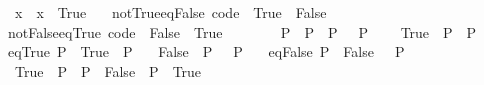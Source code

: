 \begin{isabellebody}
\ \ \ \ {\isachardoublequoteopen}{\isacharparenleft}{\kern0pt}x\ {\isacharequal}{\kern0pt}\ x{\isacharparenright}{\kern0pt}\ {\isacharequal}{\kern0pt}\ True{\isachardoublequoteclose}\isanewline
\ \ \ not{\isacharunderscore}{\kern0pt}True{\isacharunderscore}{\kern0pt}eq{\isacharunderscore}{\kern0pt}False\ {\isacharbrackleft}{\kern0pt}code{\isacharbrackright}{\kern0pt}{\isacharcolon}{\kern0pt}\ {\isachardoublequoteopen}{\isacharparenleft}{\kern0pt}{\isasymnot}\ True{\isacharparenright}{\kern0pt}\ {\isacharequal}{\kern0pt}\ False{\isachardoublequoteclose}\isanewline
\ \ \ not{\isacharunderscore}{\kern0pt}False{\isacharunderscore}{\kern0pt}eq{\isacharunderscore}{\kern0pt}True\ {\isacharbrackleft}{\kern0pt}code{\isacharbrackright}{\kern0pt}{\isacharcolon}{\kern0pt}\ {\isachardoublequoteopen}{\isacharparenleft}{\kern0pt}{\isasymnot}\ False{\isacharparenright}{\kern0pt}\ {\isacharequal}{\kern0pt}\ True{\isachardoublequoteclose}\isanewline
\ \ \isanewline
\ \ \ \ {\isachardoublequoteopen}{\isacharparenleft}{\kern0pt}{\isasymnot}\ P{\isacharparenright}{\kern0pt}\ {\isasymnoteq}\ P{\isachardoublequoteclose}\ \ {\isachardoublequoteopen}P\ {\isasymnoteq}\ {\isacharparenleft}{\kern0pt}{\isasymnot}\ P{\isacharparenright}{\kern0pt}{\isachardoublequoteclose}\isanewline
\ \ \ \ {\isachardoublequoteopen}{\isacharparenleft}{\kern0pt}True\ {\isacharequal}{\kern0pt}\ P{\isacharparenright}{\kern0pt}\ {\isacharequal}{\kern0pt}\ P{\isachardoublequoteclose}\isanewline
\ \ \ eq{\isacharunderscore}{\kern0pt}True{\isacharcolon}{\kern0pt}\ {\isachardoublequoteopen}{\isacharparenleft}{\kern0pt}P\ {\isacharequal}{\kern0pt}\ True{\isacharparenright}{\kern0pt}\ {\isacharequal}{\kern0pt}\ P{\isachardoublequoteclose}\isanewline
\ \ \ {\isachardoublequoteopen}{\isacharparenleft}{\kern0pt}False\ {\isacharequal}{\kern0pt}\ P{\isacharparenright}{\kern0pt}\ {\isacharequal}{\kern0pt}\ {\isacharparenleft}{\kern0pt}{\isasymnot}\ P{\isacharparenright}{\kern0pt}{\isachardoublequoteclose}\isanewline
\ \ \ eq{\isacharunderscore}{\kern0pt}False{\isacharcolon}{\kern0pt}\ {\isachardoublequoteopen}{\isacharparenleft}{\kern0pt}P\ {\isacharequal}{\kern0pt}\ False{\isacharparenright}{\kern0pt}\ {\isacharequal}{\kern0pt}\ {\isacharparenleft}{\kern0pt}{\isasymnot}\ P{\isacharparenright}{\kern0pt}{\isachardoublequoteclose}\isanewline
\ \ \isanewline
\ \ \ \ {\isachardoublequoteopen}{\isacharparenleft}{\kern0pt}True\ {\isasymlongrightarrow}\ P{\isacharparenright}{\kern0pt}\ {\isacharequal}{\kern0pt}\ P{\isachardoublequoteclose}\ \ {\isachardoublequoteopen}{\isacharparenleft}{\kern0pt}False\ {\isasymlongrightarrow}\ P{\isacharparenright}{\kern0pt}\ {\isacharequal}{\kern0pt}\ True{\isachardoublequoteclose}\isanewline

\end{isabellebody}
